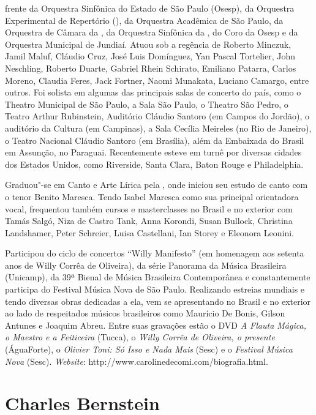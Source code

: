 frente da Orquestra Sinfônica do Estado de São Paulo (Osesp), da
Orquestra Experimental de Repertório (), da Orquestra Acadêmica de
São Paulo, da Orquestra de Câmara da , da Orquestra Sinfônica da ,
do Coro da Osesp e da Orquestra Municipal de Jundiaí. Atuou sob a
regência de Roberto Minczuk, Jamil Maluf, Cláudio Cruz, José Luis
Domínguez, Yan Pascal Tortelier, John Neschling, Roberto Duarte, Gabriel
Rhein Schirato, Emiliano Patarra, Carlos Moreno, Claudia Feres, Jack
Fortner, Naomi Munakata, Luciano Camargo, entre outros. Foi solista em
algumas das principais salas de concerto do país, como o Theatro
Municipal de São Paulo, a Sala São Paulo, o Theatro São Pedro, o Teatro
Arthur Rubinstein, Auditório Cláudio Santoro (em Campos do Jordão), o
auditório da  Cultura (em Campinas), a Sala Cecília Meireles (no Rio
de Janeiro), o Teatro Nacional Cláudio Santoro (em Brasília), além da
Embaixada do Brasil em Assunção, no Paraguai. Recentemente esteve em
turnê por diversas cidades dos Estados Unidos, como Riverside, Santa
Clara, Baton Rouge e Philadelphia.

Graduou"-se em
Canto e Arte Lírica pela , onde iniciou seu estudo de canto com o
tenor Benito Maresca. Tendo Isabel Maresca como sua principal
orientadora vocal, frequentou também cursos e masterclasses no Brasil e
no exterior com Tamás Salgó, Niza de Castro Tank, Anna Korondi, Susan
Bullock, Christina Landshamer, Peter Schreier, Luisa Castellani, Ian
Storey e Eleonora Leonini.

Participou do ciclo de concertos ``Willy Manifesto'' (em homenagem aos
setenta anos de Willy Corrêa de Oliveira), da série Panorama da Música
Brasileira (Unicamp), da 39ª Bienal de Música Brasileira Contemporânea e
constantemente participa do Festival Música Nova de São Paulo.
Realizando estreias mundiais e tendo diversas obras dedicadas a ela, vem
se apresentando no Brasil e no exterior ao lado de respeitados músicos
brasileiros como Maurício De Bonis, Gilson Antunes e Joaquim Abreu.
Entre suas gravações estão o DVD \emph{A Flauta Mágica, o Maestro e a
Feiticeira} (Tucca), o  \emph{Willy Corrêa de Oliveira, o presente}
(ÁguaForte), o  \emph{Olivier Toni: Só Isso e Nada Mais} (Sesc) e o 
\emph{Festival Música Nova} (Sesc). \emph{Website}:
http://www.carolinedecomi.com/biografia.html.

\section{Charles Bernstein}

